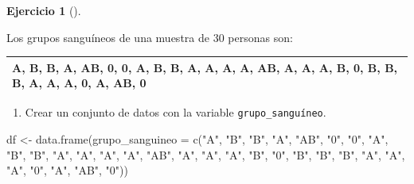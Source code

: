 \documentclass[
  a4paper,
]{scrreport}
\newenvironment{Shaded}{\begin{snugshade}}{\end{snugshade}}
\newcommand{\AttributeTok}[1]{\textcolor[rgb]{0.40,0.45,0.13}{#1}}
\newcommand{\FunctionTok}[1]{\textcolor[rgb]{0.28,0.35,0.67}{#1}}
\newcommand{\NormalTok}[1]{\textcolor[rgb]{0.00,0.23,0.31}{#1}}
\newcommand{\OtherTok}[1]{\textcolor[rgb]{0.00,0.23,0.31}{#1}}
\newcommand{\StringTok}[1]{\textcolor[rgb]{0.13,0.47,0.30}{#1}}
\providecommand{\tightlist}{%
  \setlength{\itemsep}{0pt}\setlength{\parskip}{0pt}}\usepackage{longtable,booktabs,array}
\theoremstyle{definition}
\newtheorem{exercise}{Ejercicio}[chapter]
\theoremstyle{remark}
\begin{document}
\leavevmode{}%
\begin{exercise}[]\label{exr-3}

Los grupos sanguíneos de una muestra de 30 personas son:

\begin{longtable}[]{@{}
  >{\centering\arraybackslash}p{}@{}}
\toprule()
\endhead
A, B, B, A, AB, 0, 0, A, B, B, A, A, A, A, AB, A, A, A, B, 0, B, B, B,
A, A, A, 0, A, AB, 0 \\
\bottomrule()
\end{longtable}

\begin{enumerate}
\def\labelenumi{\alph{enumi}.}
\tightlist
\item
  Crear un conjunto de datos con la variable \texttt{grupo\_sanguíneo}.
\end{enumerate}

\begin{tcolorbox}[enhanced jigsaw, rightrule=.15mm, toptitle=1mm, colbacktitle=quarto-callout-tip-color!10!white, titlerule=0mm, colback=white, leftrule=.75mm, bottomtitle=1mm, colframe=quarto-callout-tip-color-frame, breakable, title=\textcolor{quarto-callout-tip-color}{\faLightbulb}\hspace{0.5em}{Solución}, arc=.35mm, coltitle=black, opacityback=0, bottomrule=.15mm, opacitybacktitle=0.6, left=2mm, toprule=.15mm]

\begin{Shaded}
\begin{Highlighting}[]
\NormalTok{df }\OtherTok{\textless{}{-}} \FunctionTok{data.frame}\NormalTok{(}\AttributeTok{grupo\_sanguineo =} \FunctionTok{c}\NormalTok{(}\StringTok{"A"}\NormalTok{, }\StringTok{"B"}\NormalTok{, }\StringTok{"B"}\NormalTok{, }\StringTok{"A"}\NormalTok{, }\StringTok{"AB"}\NormalTok{, }\StringTok{"0"}\NormalTok{, }\StringTok{"0"}\NormalTok{, }\StringTok{"A"}\NormalTok{, }\StringTok{"B"}\NormalTok{, }\StringTok{"B"}\NormalTok{, }\StringTok{"A"}\NormalTok{, }\StringTok{"A"}\NormalTok{, }\StringTok{"A"}\NormalTok{, }\StringTok{"A"}\NormalTok{, }\StringTok{"AB"}\NormalTok{, }\StringTok{"A"}\NormalTok{, }\StringTok{"A"}\NormalTok{, }\StringTok{"A"}\NormalTok{, }\StringTok{"B"}\NormalTok{, }\StringTok{"0"}\NormalTok{, }\StringTok{"B"}\NormalTok{, }\StringTok{"B"}\NormalTok{, }\StringTok{"B"}\NormalTok{, }\StringTok{"A"}\NormalTok{, }\StringTok{"A"}\NormalTok{, }\StringTok{"A"}\NormalTok{, }\StringTok{"0"}\NormalTok{, }\StringTok{"A"}\NormalTok{, }\StringTok{"AB"}\NormalTok{, }\StringTok{"0"}\NormalTok{))}
\end{Highlighting}
\end{Shaded}


\end{tcolorbox}
\end{exercise}
\end{document}
